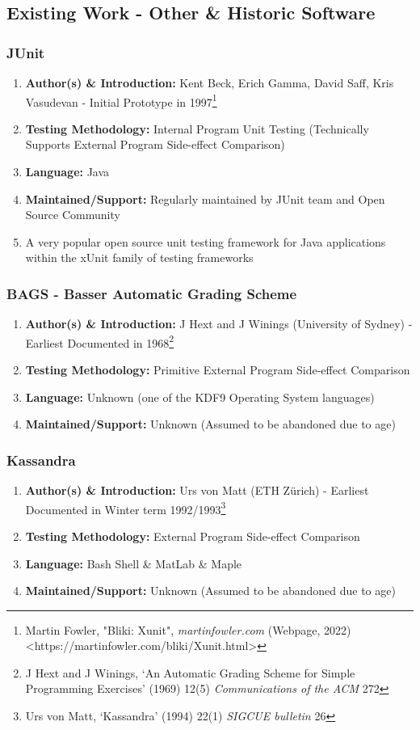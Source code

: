 \documentclass[xcolor]{beamer}
\begin{document}
\subsection{Existing Work - Other \& Historic Software}
\begin{frame}
	\frametitle{JUnit}
	\begin{enumerate}
		\setlength\itemsep{1em}
		\item \textbf{Author(s) \& Introduction:} Kent Beck, Erich Gamma, David Saff, Kris Vasudevan - Initial Prototype in 1997\footnote{Martin Fowler, "Bliki: Xunit", \textit{martinfowler.com} (Webpage, 2022) <https://martinfowler.com/bliki/Xunit.html>}
			\pause
		\item \textbf{Testing Methodology:} Internal Program Unit Testing (Technically Supports External Program Side-effect Comparison)
			\pause
		\item \textbf{Language:} Java
			\pause
		\item \textbf{Maintained/Support:} Regularly maintained by JUnit team and Open Source Community
			\pause 
		\item A very popular open source unit testing framework for Java applications within the xUnit family of testing frameworks
	\end{enumerate}
\end{frame}
\begin{frame}
	\frametitle{BAGS - Basser Automatic Grading Scheme}
	\begin{enumerate}
		\setlength\itemsep{1em}
		\item \textbf{Author(s) \& Introduction:} J Hext and J Winings (University of Sydney) - Earliest Documented in 1968\footnote{J Hext and J Winings, ‘An Automatic Grading Scheme for Simple Programming Exercises’ (1969) 12(5) \textit{Communications of the ACM} 272}
			\pause
		\item \textbf{Testing Methodology:} Primitive External Program Side-effect Comparison
			\pause
		\item \textbf{Language:} Unknown (one of the KDF9 Operating System languages)
			\pause
		\item \textbf{Maintained/Support:} Unknown (Assumed to be abandoned due to age)
	\end{enumerate}
\end{frame}
\begin{frame}
	\frametitle{Kassandra}
	\begin{enumerate}
		\setlength\itemsep{1em}
		\item \textbf{Author(s) \& Introduction:} Urs von Matt (ETH Zürich) - Earliest Documented in Winter term 1992/1993\footnote{Urs von Matt, ‘Kassandra’ (1994) 22(1) \textit{SIGCUE bulletin} 26}
			\pause
		\item \textbf{Testing Methodology:} External Program Side-effect Comparison
			\pause
		\item \textbf{Language:} Bash Shell \& MatLab \& Maple
			\pause
		\item \textbf{Maintained/Support:} Unknown (Assumed to be abandoned due to age)
	\end{enumerate}
\end{frame}
\end{document}
